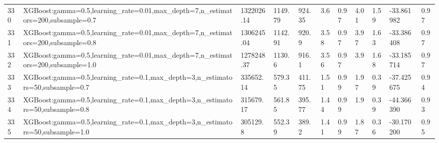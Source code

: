 \begin{longtable}{C{0.8cm} L{2cm} C{1.15cm} C{1.15cm} C{1.15cm} C{1.15cm} C{0.85cm} C{1.25cm} C{1.2cm} C{1.5cm} C{1.0cm}}
330 & XGBoost:\newline gamma=0.5,\newline learning\_rate=0.01,\newline max\_depth=7,\newline n\_estimators=200,\newline subsample=0.7 & 1322026.14 & 1149.79 & 924.35 & 3.6 & 0.97 & 4.01 & 1.59 & -33.861982 & 0.97 \\
331 & XGBoost:\newline gamma=0.5,\newline learning\_rate=0.01,\newline max\_depth=7,\newline n\_estimators=200,\newline subsample=0.8 & 1306245.04 & 1142.91 & 920.9 & 3.58 & 0.97 & 3.97 & 1.63 & -33.386408 & 0.97 \\
332 & XGBoost:\newline gamma=0.5,\newline learning\_rate=0.01,\newline max\_depth=7,\newline n\_estimators=200,\newline subsample=1.0 & 1278248.37 & 1130.6 & 916.1 & 3.56 & 0.97 & 3.9 & 1.68 & -33.185714 & 0.97 \\
333 & XGBoost:\newline gamma=0.5,\newline learning\_rate=0.1,\newline max\_depth=3,\newline n\_estimators=50,\newline subsample=0.7 & 335652.14 & 579.35 & 411.75 & 1.51 & 0.99 & 1.97 & 0.39 & -37.425675 & 0.94 \\
334 & XGBoost:\newline gamma=0.5,\newline learning\_rate=0.1,\newline max\_depth=3,\newline n\_estimators=50,\newline subsample=0.8 & 315679.17 & 561.85 & 395.77 & 1.44 & 0.99 & 1.9 & 0.39 & -44.366390 & 0.93 \\
335 & XGBoost:\newline gamma=0.5,\newline learning\_rate=0.1,\newline max\_depth=3,\newline n\_estimators=50,\newline subsample=1.0 & 305129.8 & 552.39 & 389.2 & 1.41 & 0.99 & 1.87 & 0.36 & -30.170200 & 0.95 \\

\end{longtable}
